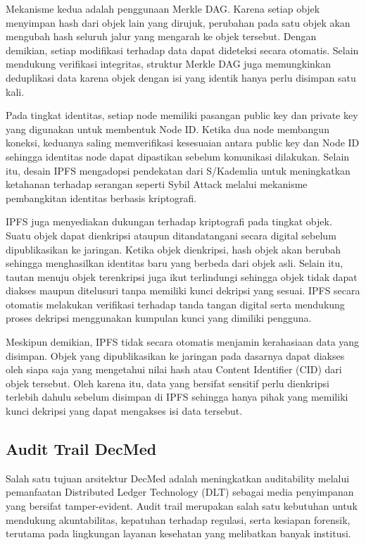 Mekanisme kedua adalah penggunaan Merkle DAG. Karena setiap objek menyimpan hash dari objek lain yang dirujuk, perubahan pada satu objek akan mengubah hash seluruh jalur yang mengarah ke objek tersebut. Dengan demikian, setiap modifikasi terhadap data dapat dideteksi secara otomatis. Selain mendukung verifikasi integritas, struktur Merkle DAG juga memungkinkan deduplikasi data karena objek dengan isi yang identik hanya perlu disimpan satu kali.

Pada tingkat identitas, setiap node memiliki pasangan public key dan private key yang digunakan untuk membentuk Node ID. Ketika dua node membangun koneksi, keduanya saling memverifikasi kesesuaian antara public key dan Node ID sehingga identitas node dapat dipastikan sebelum komunikasi dilakukan. Selain itu, desain IPFS mengadopsi pendekatan dari S/Kademlia untuk meningkatkan ketahanan terhadap serangan seperti Sybil Attack melalui mekanisme pembangkitan identitas berbasis kriptografi.

IPFS juga menyediakan dukungan terhadap kriptografi pada tingkat objek. Suatu objek dapat dienkripsi ataupun ditandatangani secara digital sebelum dipublikasikan ke jaringan. Ketika objek dienkripsi, hash objek akan berubah sehingga menghasilkan identitas baru yang berbeda dari objek asli. Selain itu, tautan menuju objek terenkripsi juga ikut terlindungi sehingga objek tidak dapat diakses maupun ditelusuri tanpa memiliki kunci dekripsi yang sesuai. IPFS secara otomatis melakukan verifikasi terhadap tanda tangan digital serta mendukung proses dekripsi menggunakan kumpulan kunci yang dimiliki pengguna.

Meskipun demikian, IPFS tidak secara otomatis menjamin kerahasiaan data yang disimpan. Objek yang dipublikasikan ke jaringan pada dasarnya dapat diakses oleh siapa saja yang mengetahui nilai hash atau Content Identifier (CID) dari objek tersebut. Oleh karena itu, data yang bersifat sensitif perlu dienkripsi terlebih dahulu sebelum disimpan di IPFS sehingga hanya pihak yang memiliki kunci dekripsi yang dapat mengakses isi data tersebut.

\subsection{Audit Trail DecMed}

Salah satu tujuan arsitektur DecMed adalah meningkatkan auditability melalui pemanfaatan Distributed Ledger Technology (DLT) sebagai media penyimpanan yang bersifat tamper-evident. Audit trail merupakan salah satu kebutuhan untuk mendukung akuntabilitas, kepatuhan terhadap regulasi, serta kesiapan forensik, terutama pada lingkungan layanan kesehatan yang melibatkan banyak institusi.


